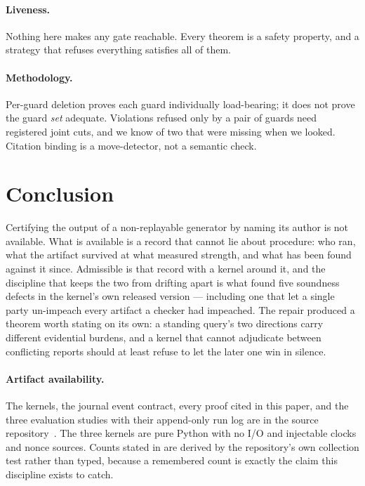 \documentclass[11pt,a4paper]{article}
\theoremstyle{plain}
\theoremstyle{definition}
\theoremstyle{remark}
\begin{document}
\paragraph{Liveness.} Nothing here makes any gate reachable. Every theorem is a safety property, and a strategy that refuses everything satisfies all of them.

\paragraph{Methodology.} Per-guard deletion proves each guard individually load-bearing; it does not prove the guard \emph{set} adequate. Violations refused only by a pair of guards need registered joint cuts, and we know of two that were missing when we looked. Citation binding is a move-detector, not a semantic check.

\section{Conclusion}

Certifying the output of a non-replayable generator by naming its author is not available. What is available is a record that cannot lie about procedure: who ran, what the artifact survived at what measured strength, and what has been found against it since. Admissible is that record with a kernel around it, and the discipline that keeps the two from drifting apart is what found five soundness defects in the kernel's own released version --- including one that let a single party un-impeach every artifact a checker had impeached. The repair produced a theorem worth stating on its own: a standing query's two directions carry different evidential burdens, and a kernel that cannot adjudicate between conflicting reports should at least refuse to let the later one win in silence.

\paragraph{Artifact availability.} The kernels, the journal event contract, every proof cited in this paper, and the three evaluation studies with their append-only run log are in the source repository~\cite{repo}. The three kernels are pure Python with no I/O and injectable clocks and nonce sources. Counts stated in  are derived by the repository's own collection test rather than typed, because a remembered count is exactly the claim this discipline exists to catch.
\end{document}
